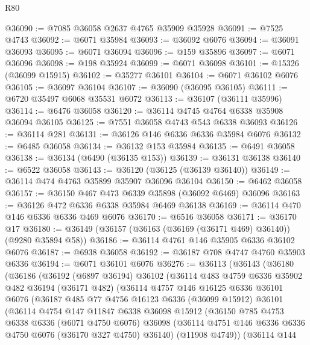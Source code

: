 \begin{lexlean}{R80}
\begin{coremodule}
@36090 := @7085 @36058 @2637 @4765 @35909 @35928
@36091 := @7525 @4743
@36092 := @6071 @35984
@36093 := @36092 @6076
@36094 := @36091 @36093
@36095 := @6071 @36094
@36096 := @159 @35896
@36097 := @6071 @36096
@36098 := @198 @35924
@36099 := @6071 @36098
@36101 := @15326 (@36099 @15915)
@36102 := @35277 @36101
@36104 := @6071 @36102 @6076
@36105 := @36097 @36104
@36107 := @36090 (@36095 @36105)
@36111 := @6720 @35497 @6068 @35531 @6072
@36113 := @36107 (@36111 @35996)
@36114 := @6476 @36058
@36120 := @36114 @4745 @4764 @6338 @35908 @36094 @36105
@36125 := @7551 @36058 @4743 @543 @6338 @36093
@36126 := @36114 @281
@36131 := @36126 @146 @6336 @6336 @35984 @6076
@36132 := @6485 @36058
@36134 := @36132 @153 @35984
@36135 := @6491 @36058
@36138 := @36134 (@6490 (@36135 @153))
@36139 := @36131 @36138
@36140 := @6522 @36058
@36143 := @36120 (@36125 (@36139 @36140))
@36149 := @36114 @474 @4763 @35899 @35907 @36096 @36104
@36150 := @6462 @36058
@36157 := @36150 @467 @473 @6339 @35898 (@36092 @6469) @36096
@36163 := @36126 @472 @6336 @6338 @35984 @6469 @36138
@36169 := @36114 @470 @146 @6336 @6336 @469 @6076
@36170 := @6516 @36058
@36171 := @36170 @17
@36180 := @36149 (@36157 (@36163 (@36169 (@36171 @469) @36140)) (@9280 @35894 @58))
@36186 := @36114 @4761 @146 @35905 @6336 @36102 @6076
@36187 := @6938 @36058
@36192 := @36187 @708 @4747 @4760 @35903 @6336
@36194 := @6071 @36101 @6076
@36276 := @36113
    (@36143
      (@36180
        (@36186
          (@36192
            (@6897 @36194)
            @36102
            (@36114
              @483
              @4759
              @6336
              @35902
              @482
              @36194
              (@36171 @482)
              (@36114
                @4757
                @146
                @16125
                @6336
                @36101
                @6076
                (@36187
                  @485
                  @77
                  @4756
                  @16123
                  @6336
                  (@36099 @15912)
                  @36101
                  (@36114
                    @4754
                    @147
                    @11847
                    @6338
                    @36098
                    @15912
                    (@36150
                      @785
                      @4753
                      @6338
                      @6336
                      (@6071 @4750 @6076)
                      @36098
                      (@36114 @4751 @146 @6336 @6336 @4750 @6076 (@36170 @327 @4750) @36140)
                      (@11908 @4749))
                    (@36114
                      @144

\end{coremodule}
\end{lexlean}
